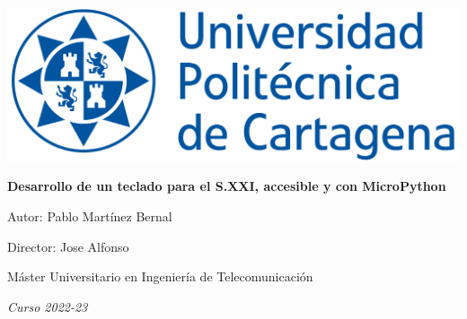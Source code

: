 \begin{titlepage}
    \vspace{5cm}
    {\centering
        \hspace{3cm}\includegraphics[width=.7\textwidth]{images/UPCT-front.jpg}
        
        \vspace{5cm}
        \hspace{2cm}\huge\textbf{\color{RoyalBlue}Desarrollo de un teclado para el S.XXI, accesible y con MicroPython} 
        
        {\LARGE
        \vspace*{\fill}
        \begin{flushright}
          \item Autor: Pablo Martínez Bernal
          \item Director: Jose Alfonso %
          \item Máster Universitario en Ingeniería de Telecomunicación
          \item \textit{Curso 2022-23}   
        \end{flushright}
        }
    }
\end{titlepage}

